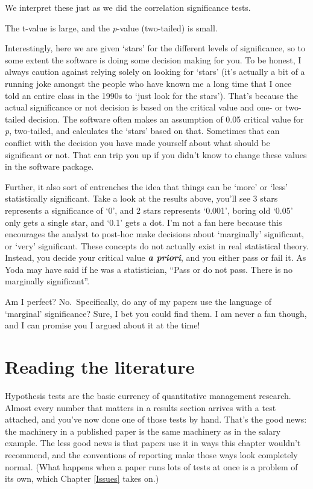 \documentclass[
]{book}
\begin{document}
We interpret these just as we did the correlation significance tests.

The t-value is large, and the \emph{p}-value (two-tailed) is small.

Interestingly, here we are given `stars' for the different levels of significance, so to some extent the software is doing some decision making for you. To be honest, I always caution against relying solely on looking for `stars' (it's actually a bit of a running joke amongst the people who have known me a long time that I once told an entire class in the 1990s to `just look for the stars'). That's because the actual significance or not decision is based on the critical value and one- or two-tailed decision. The software often makes an assumption of 0.05 critical value for \emph{p}, two-tailed, and calculates the `stars' based on that. Sometimes that can conflict with the decision you have made yourself about what should be significant or not. That can trip you up if you didn't know to change these values in the software package.

Further, it also sort of entrenches the idea that things can be `more' or `less' statistically significant. Take a look at the results above, you'll see 3 stars represents a significance of `0', and 2 stars represents `0.001', boring old `0.05' only gets a single star, and `0.1' gets a dot. I'm not a fan here because this encourages the analyst to post-hoc make decisions about `marginally' significant, or `very' significant. These concepts do not actually exist in real statistical theory. Instead, you decide your critical value \textbf{\emph{a priori}}, and you either pass or fail it. As Yoda may have said if he was a statistician, ``Pass or do not pass. There is no marginally significant''.

Am I perfect? No.~Specifically, do any of my papers use the language of `marginal' significance? Sure, I bet you could find them. I am never a fan though, and I can promise you I argued about it at the time!

\section{Reading the literature}\label{H-testing-reading}

Hypothesis tests are the basic currency of quantitative management research. Almost every number that matters in a results section arrives with a test attached, and you've now done one of those tests by hand. That's the good news: the machinery in a published paper is the same machinery as in the salary example. The less good news is that papers use it in ways this chapter wouldn't recommend, and the conventions of reporting make those ways look completely normal. (What happens when a paper runs lots of tests at once is a problem of its own, which Chapter \ref{Issues} takes on.)
\end{document}
